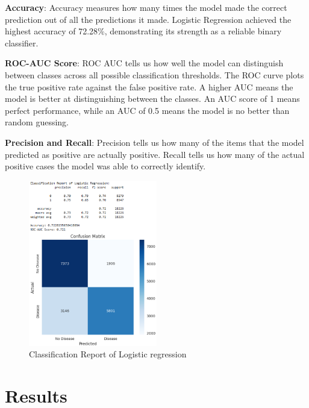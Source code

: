 \documentclass[12pt]{article}
\begin{document}
\textbf{Accuracy}: Accuracy measures how many times the model made the correct prediction out of all the predictions it made. Logistic Regression achieved the highest accuracy of 72.28\%, demonstrating its strength as a reliable binary classifier.

\textbf{ROC-AUC Score}: ROC AUC tells us how well the model can distinguish between classes across all possible classification thresholds. The ROC curve plots the true positive rate against the false positive rate. A higher AUC means the model is better at distinguishing between the classes. An AUC score of 1 means perfect performance, while an AUC of 0.5 means the model is no better than random guessing. 

\textbf{Precision and Recall}: Precision tells us how many of the items that the model predicted as positive are actually positive. Recall tells us how many of the actual positive cases the model was able to correctly identify. 
\begin{figure}[H]
\centering
\captionsetup{font=small}
\includegraphics[width=0.5\textwidth]{classification.eps} 
\caption{Classification Report of Logistic regression}
\label{fig:classification}
\end{figure}

\section{Results}
\end{document}
